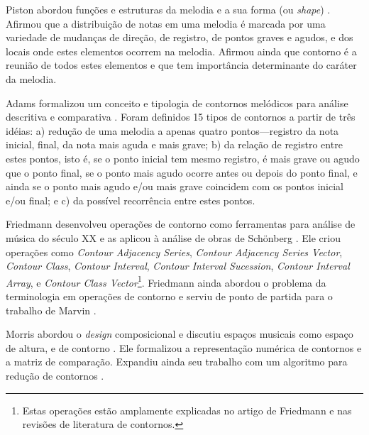 \documentclass[12pt]{article}
\newcommand{\eng}[1]{\textit{#1}}
\begin{document}

Piston abordou funções e estruturas da melodia e a sua forma (ou
\eng{shape}) \cite{piston59:harmony}. Afirmou que a distribuição de
notas em uma melodia é marcada por uma variedade de mudanças de
direção, de registro, de pontos graves e agudos, e dos locais onde
estes elementos ocorrem na melodia. Afirmou ainda que contorno é a
reunião de todos estes elementos e que tem importância determinante do
caráter da melodia.



Adams formalizou um conceito e tipologia de contornos melódicos para
análise descritiva e comparativa \cite{adams76:melodic}. Foram
definidos 15 tipos de contornos a partir de três idéias: a) redução de
uma melodia a apenas quatro pontos---registro da nota inicial, final,
da nota mais aguda e mais grave; b) da relação de registro entre estes
pontos, isto é, se o ponto inicial tem mesmo registro, é mais grave ou
agudo que o ponto final, se o ponto mais agudo ocorre antes ou depois
do ponto final, e ainda se o ponto mais agudo e/ou mais grave
coincidem com os pontos inicial e/ou final; e c) da possível
recorrência entre estes pontos.


Friedmann desenvolveu operações de contorno como ferramentas para
análise de música do século XX e as aplicou à análise de obras de
Schönberg \cite{friedmann85:methodology}. Ele criou operações como
\eng{Contour Adjacency Series}, \eng{Contour Adjacency Series Vector},
\eng{Contour Class}, \eng{Contour Interval}, \eng{Contour Interval
  Sucession}, \eng{Contour Interval Array}, e \eng{Contour Class
  Vector}\footnote{Estas operações estão amplamente explicadas no
  artigo de Friedmann e nas revisões de literatura de
  contornos.}. Friedmann ainda abordou o problema da terminologia em
operações de contorno \cite{friedmann87:response} e serviu de ponto de
partida para o trabalho de Marvin \cite{marvin88:generalized}.


Morris abordou o \eng{design} composicional e discutiu espaços
musicais como espaço de altura, e de contorno
\cite{morris87:composition}. Ele formalizou a representação numérica
de contornos e a matriz de comparação. Expandiu ainda seu trabalho com
um algoritmo para redução de contornos \cite{morris93:directions}.

\end{document}
